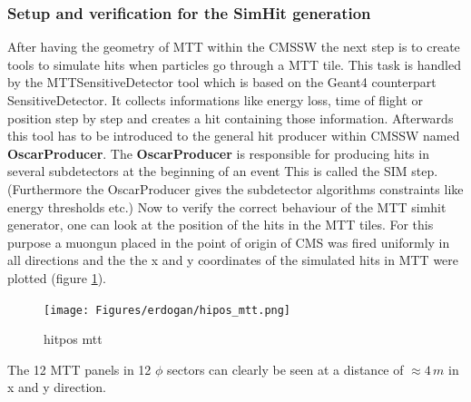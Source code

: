 		\subsubsection{Setup and verification for the SimHit generation}
			After having the geometry of MTT within the CMSSW the next step is to create tools to simulate hits when particles go through a MTT tile.
			This task is handled by the MTTSensitiveDetector tool which is based on the Geant4 counterpart SensitiveDetector.
			It collects informations like energy loss, time of flight or position step by step and creates a hit containing those information.
			Afterwards this tool has to be introduced to the general hit producer within CMSSW named \textbf{OscarProducer}.
			The \textbf{OscarProducer} is responsible for producing hits in several subdetectors at the beginning of an event
			This is called the SIM step.
			(Furthermore the OscarProducer gives the subdetector algorithms constraints like energy thresholds etc.)
			Now to verify the correct behaviour of the MTT simhit generator, one can look at the position of the hits in the MTT tiles.
			For this purpose a muongun placed in the point of origin of CMS was fired uniformly in all directions and the the x and y coordinates of the simulated hits in MTT were plotted (figure
			\ref{fig:hitpos_mtt}).
			\begin{figure}[htbp]
				\centering
				\texttt{[image: Figures/erdogan/hipos\_mtt.png]}
				\caption{hitpos mtt}
				\label{fig:hitpos_mtt}
			\end{figure}
			The 12 MTT panels in 12 $\phi$ sectors can clearly be seen at a distance of $\approx4\,m$ in x and y direction.

